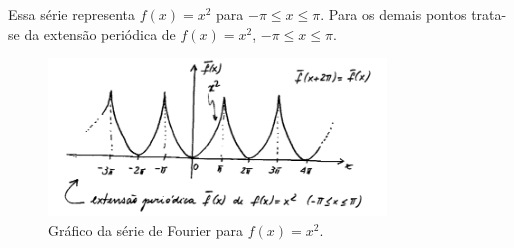 \begin{obs}
  Essa série representa $f(x) = x^2$ para $-\pi \leq x \leq \pi$. Para os demais
  pontos trata-se da extensão periódica de $f(x) = x^2$, $-\pi \leq x \leq \pi$.
\end{obs}

\begin{figure}[!htb]
  \centering
  \includegraphics[width=0.8\textwidth]{figuras/01-0}
  \caption{Gráfico da série de Fourier para $f(x) = x^2$.}
  \label{fig:serie_fourier_grafico01}
\end{figure}

